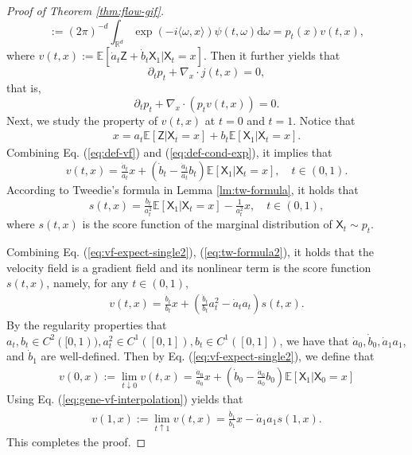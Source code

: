 \documentclass[twoside,11pt]{article}
\newcommand{\E}{\mathbb{E}}
\def\paref#1{(\ref{#1})}
\numberwithin{equation}{section}
\begin{document}
\begin{proof} [Proof of Theorem \ref{thm:flow-gif}]
\begin{equation*}
    := (2 \pi)^{-d} \int_{\mathbb{R}^d}\exp(-i \langle \omega, x \rangle) \psi(t, \omega) \mathrm{d} \omega
    = p_t(x) v(t, x),
\end{equation*}
where $v(t, x) := \E[ \dot{a}_t \mathsf{Z} + \dot{b}_t \mathsf{X}_1 | \mathsf{X}_t = x]$.
Then it further yields that
\begin{equation*}
    \partial_t p_t + \nabla_x \cdot j(t, x) = 0,
\end{equation*}
that is,
\begin{equation*}
    \partial_t p_t + \nabla_x \cdot (p_t v(t, x)) = 0.
\end{equation*}
Next, we study the property of $v(t, x)$ at $t = 0$ and $t = 1$.
Notice that
\begin{align} \label{eq:def-cond-exp}
    x = a_t \E[\mathsf{Z} | \mathsf{X}_t = x] + b_t \E[\mathsf{X}_1 | \mathsf{X}_t = x].
\end{align}
Combining Eq. \paref{eq:def-vf} and \paref{eq:def-cond-exp}, it implies that
\begin{equation} \label{eq:vf-expect-single2}
    v(t, x) = \tfrac{\dot{a}_t}{a_t} x + \left( \dot{b}_t - \tfrac{\dot{a}_t}{a_t}b_t \right) \E[\mathsf{X}_1 | \mathsf{X}_t = x], \quad t \in (0, 1).
\end{equation}
According to Tweedie's formula in Lemma \ref{lm:tw-formula}, it holds that
\begin{equation}
    \label{eq:tw-formula2}
    s(t, x) = \tfrac{b_t}{a_t^2} \E \left[ \mathsf{X}_1 | \mathsf{X}_t = x \right] - \tfrac{1}{a_t^2} x, \quad t \in (0, 1),
\end{equation}
where $s(t, x)$ is the score function of the marginal distribution of $\mathsf{X}_t \sim p_t$.

Combining Eq. \paref{eq:vf-expect-single2}, \paref{eq:tw-formula2}, it holds that the velocity field is a gradient field and its nonlinear term is the score function $s(t, x)$, namely, for any $t \in (0, 1)$,
\begin{align}
    \label{eq:gene-vf-interpolation}
    v(t, x) = \tfrac{\dot{b}_t}{b_t} x + \left( \tfrac{\dot{b}_t}{b_t} a_t^2 - \dot{a}_t a_t \right) s(t, x).
\end{align}
By the regularity properties that $a_t, b_t \in C^2([0,1)), a_t^2 \in C^1([0, 1]), b_t \in C^1([0, 1])$, we have that $\dot{a}_0, \dot{b}_0, \dot{a}_1 a_1$, and $\dot{b}_1$ are well-defined.
Then by Eq. \paref{eq:vf-expect-single2}, we define that
\begin{align*}
    v(0, x) := \lim_{t \downarrow 0} v(t, x)
    = \tfrac{\dot{a}_0}{a_0} x + \left( \dot{b}_0 - \tfrac{\dot{a}_0}{a_0}b_0 \right) \E[\mathsf{X}_1 | \mathsf{X}_0 = x]
\end{align*}
Using Eq. \paref{eq:gene-vf-interpolation} yields that
\begin{align} \label{eq:vf-time1}
    v(1, x) := \lim_{t \uparrow 1} v(t, x)
    = \tfrac{\dot{b}_1}{b_1} x - \dot{a}_1 a_1 s(1, x).
\end{align}
This completes the proof.
\end{proof}
\end{document}
